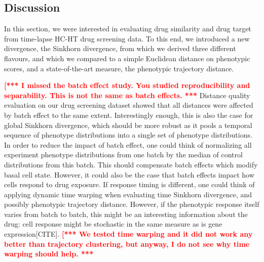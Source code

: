 
\subsection{Discussion}
In this section, we were interested in evaluating drug similarity and drug target from time-lapse HC-HT drug screening data. To this end, we introduced a new divergence, the Sinkhorn divergence, from which we derived three different flavours, and which we compared to a simple Euclidean distance on phenotypic scores, and a state-of-the-art measure, the phenotypic trajectory distance.

\textcolor{red}{\bf [*** I missed the batch effect study. You studied
  reproducibility and separability. This is not the same as batch
  effects. ***} 
Distance quality evaluation on our drug screening dataset showed that
all distances were affected by batch effect to the same
extent. Interestingly enough, this is also the case for global
Sinkhorn divergence, which should be more robust as it pools a
temporal sequence of phenotype distributions into a single set of
phenotype distributions. In order to reduce the impact of batch
effect, one could think of normalizing all experiment phenotype
distributions from one batch by the median of control distributions
from this batch. This should compensate batch effects which modify
basal cell state. However, it could also be the case that batch
effects impact how cells respond to drug exposure. If response timing
is different, one could think of applying dynamic time warping when
evaluating time Sinkhorn divergence, and possibly phenotypic
trajectory distance. However, if the phenotypic response itself varies
from batch to batch, this might be an interesting information about
the drug: cell response might be stochastic in the same measure as is
gene expression[CITE]. \textcolor{red}{\bf [*** We tested time
  warping and it did not work any better than trajectory clustering,
  but anyway, I do not see why time warping should help. ***} 

